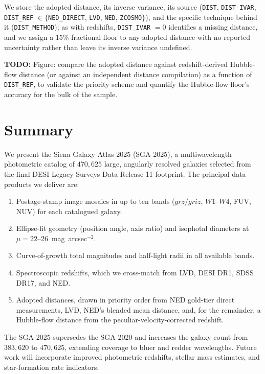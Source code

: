 \documentclass[modern,linenumbers]{aastex701}
\newcommand{\todo}[1]{{\color{red}\textbf{TODO:} #1}}
\begin{document}
We store the adopted distance, its inverse variance, its source
(\texttt{DIST}, \texttt{DIST\_IVAR}, \texttt{DIST\_REF} $\in
\{$\texttt{NED\_DIRECT}, \texttt{LVD}, \texttt{NED}, \texttt{ZCOSMO}$\}$),
and the specific technique behind it (\texttt{DIST\_METHOD}); as with
redshifts, \texttt{DIST\_IVAR} $= 0$ identifies a missing distance, and we
assign a 15\% fractional floor to any adopted distance with no reported
uncertainty rather than leave its inverse variance undefined.

\todo{Figure: compare the adopted distance against redshift-derived Hubble-flow
  distance (or against an independent distance compilation) as a function of
  \texttt{DIST\_REF}, to validate the priority scheme and quantify the
  Hubble-flow floor's accuracy for the bulk of the sample.}

\section{Summary}
\label{sec:summary}

We present the Siena Galaxy Atlas 2025 (SGA-2025), a multiwavelength
photometric catalog of $470{,}625$ large, angularly resolved galaxies
selected from the final DESI Legacy Surveys Data Release 11 footprint.
The principal data products we deliver are:

\begin{enumerate}
  \item Postage-stamp image mosaics in up to ten bands ($grz/griz$,
    $W1$--$W4$, FUV, NUV) for each catalogued galaxy.
  \item Ellipse-fit geometry (position angle, axis ratio) and isophotal
    diameters at $\mu = 22$--26~mag~arcsec$^{-2}$.
  \item Curve-of-growth total magnitudes and half-light radii in all
    available bands.
  \item Spectroscopic redshifts, which we cross-match from LVD, DESI DR1,
    SDSS DR17, and NED.
  \item Adopted distances, drawn in priority order from NED gold-tier
    direct measurements, LVD, NED's blended mean distance, and, for the
    remainder, a Hubble-flow distance from the peculiar-velocity-corrected
    redshift.
\end{enumerate}

The SGA-2025 supersedes the SGA-2020 \citep{moustakas23a} and increases
the galaxy count from $383{,}620$ to $470{,}625$, extending coverage to bluer and
redder wavelengths. Future work will incorporate improved photometric
redshifts, stellar mass estimates, and star-formation rate indicators.
\end{document}
